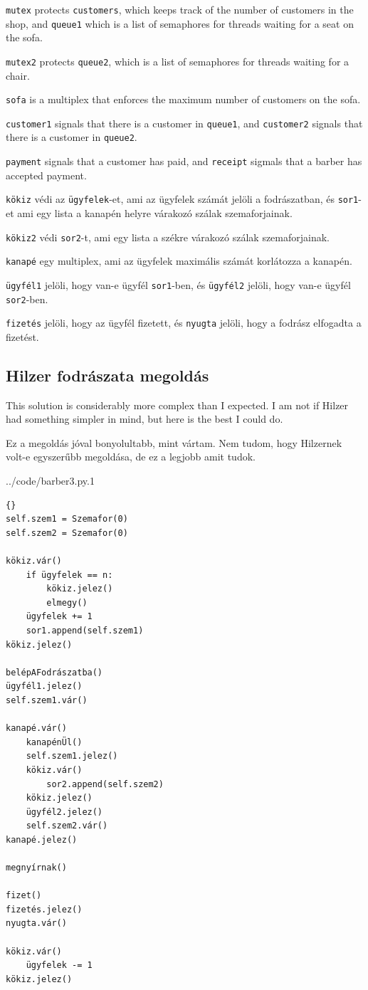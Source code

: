 \documentclass{book}
\newcommand{\clearemptydoublepage}{\newpage\cleardoublepage}
\begin{document}
{\tt mutex} protects {\tt customers}, which keeps track of the
number of customers in the shop, and {\tt queue1} which is a list
of semaphores for threads waiting for a seat on the sofa.

{\tt mutex2} protects {\tt queue2}, which is a list
of semaphores for threads waiting for a chair.

{\tt sofa} is a multiplex that enforces the maximum number of customers
on the sofa.

{\tt customer1} signals that there is a customer in {\tt queue1}, and
{\tt customer2} signals that there is a customer in {\tt queue2}.

{\tt payment} signals that a customer has paid, and {\tt receipt}
sigmals that a barber has accepted payment.

{\tt kökiz} védi az {\tt ügyfelek}-et, ami az ügyfelek számát jelöli a fodrászatban,
és {\tt sor1}-et ami egy lista a kanapén helyre várakozó szálak szemaforjainak.

{\tt kökiz2} védi  {\tt sor2}-t, ami egy lista a székre várakozó szálak szemaforjainak.

{\tt kanapé} egy multiplex, ami az ügyfelek maximális számát korlátozza a kanapén.

{\tt ügyfél1} jelöli, hogy van-e ügyfél {\tt sor1}-ben, és {\tt ügyfél2} jelöli,
hogy van-e ügyfél {\tt sor2}-ben.

{\tt fizetés} jelöli, hogy az ügyfél fizetett, és {\tt nyugta} jelöli, hogy a fodrász
elfogadta a fizetést.

\clearemptydoublepage
\subsection{Hilzer fodrászata megoldás}

This solution is considerably more complex than I expected.  I
am not if Hilzer had something simpler in mind, but here is the
best I could do.

Ez a megoldás jóval bonyolultabb, mint vártam. Nem tudom,
hogy Hilzernek volt-e egyszerűbb megoldása, de ez a legjobb amit tudok.


{../code/barber3.py.1}

\begin{lstlisting}[title={Hilzer fodrászata megoldás (ügyfél)}]{}
self.szem1 = Szemafor(0)
self.szem2 = Szemafor(0)

kökiz.vár()
    if ügyfelek == n:
        kökiz.jelez()
        elmegy()
    ügyfelek += 1
    sor1.append(self.szem1)
kökiz.jelez()

belépAFodrászatba()
ügyfél1.jelez()
self.szem1.vár()

kanapé.vár()
    kanapénÜl()
    self.szem1.jelez()
    kökiz.vár()
        sor2.append(self.szem2)
    kökiz.jelez()
    ügyfél2.jelez()
    self.szem2.vár()
kanapé.jelez()

megnyírnak()

fizet()
fizetés.jelez()
nyugta.vár()

kökiz.vár()
    ügyfelek -= 1
kökiz.jelez()
\end{lstlisting}
\end{document}
